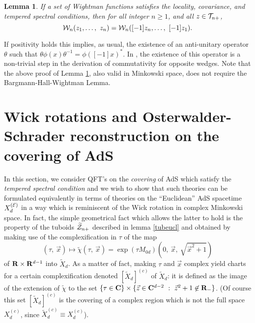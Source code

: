 \documentclass[a4paper,a4paper]{article}
\let\UnmodifSec=\section
\renewcommand{\section}{\setcounter{equation}{0}\UnmodifSec}
\newtheorem{lemma}{Lemma}[section]
\def\bC{{\bf C}}
\def\bR{{\bf R}}
\def\TT{{\cal T}}
\def\WW{{\cal W}}
\def\ZZ{{\cal Z}}
\def\wt{\widetilde}
\def\wchi{{\wt \chi}}
\begin{document}
\begin{lemma}
\label{ctp}
If a set of Wightman functions satisfies the locality, covariance,
and tempered spectral conditions, then for all integer $n \ge 1$,
and all $z \in \TT_{n+}$,
\begin{equation}
\WW_n(z_1,\ldots,\ z_n) =
\WW_n([-1]z_n,\ldots,\ [-1]z_1).
\label{5.17}\end{equation}
\end{lemma}
If positivity holds this implies, as usual, the existence of an
anti-unitary operator $\theta$ such that
$\theta \phi(x) \theta^{-1} = \phi([-1]x)^*$.
In \cite{BFS},
the existence of this operator is a non-trivial
step in the derivation of commutativity for opposite wedges.
Note that the above proof of
Lemma \ref{ctp}, also valid in Minkowski
space, does not require the Bargmann-Hall-Wightman Lemma.

\section{Wick rotations and Osterwalder-Schrader reconstruction
on the covering of AdS}


\label{WR}


\def\param{{\wchi}}
In this section, we consider QFT's on the {\sl covering} of AdS
which satisfy the {\sl tempered spectral condition} and we wish
to show that such theories can be formulated equivalently in terms of
theories on the ``Euclidean'' AdS spacetime $X_d^{(\cal E)}$
in a way which is reminiscent of the Wick rotation in complex Minkowski
space. In fact, the simple geometrical fact which allows the
latter to hold is the property of the tuboids $\wt \ZZ_{n+}$
described in lemma \ref{tubeucl} and obtained by
making use of the complexification
in $\tau$ of the map
\begin{equation}
(\tau,\ \vec{x}) \mapsto \param(\tau,\ \vec{x}) =
\exp(\tau M_{0d})(0,\ \vec{x},\ \sqrt{\vec{x}^2 +1})
\label{7.1}\end{equation}
of $\bR \times \bR^{d-1}$ into $\wt X_d$.
As a matter of fact,
making $\tau$ and $\vec{x}$ complex yield charts for
a certain complexification denoted $ [\wt X_d]^{(c)}$ of $\wt X_d$:
it is defined as the image of the extension of $\wchi$
to the set
$\{\tau \in \bC\} \times\{\vec{z} \in \bC^{d-2}\ :
\ \vec{z}^2 + 1 \not\in \bR_-\} $. (Of course this set
$ [\wt X_d]^{(c)}$ is the covering of a complex region which is not the full
space $X_d^{(c)}$, since
$ \wt X_d^{(c)} \equiv  X_d^{(c)}$).
\end{document}
